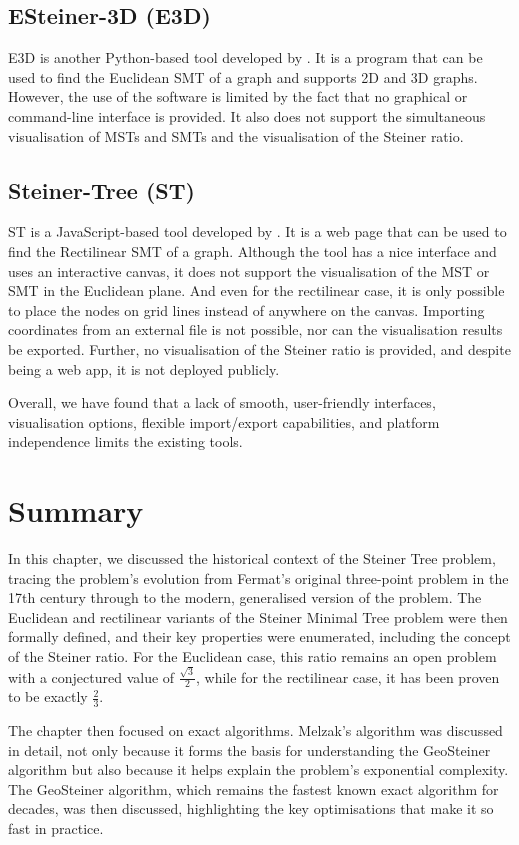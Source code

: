 \documentclass{l4proj}
\begin{document}
\subsection{ESteiner-3D (E3D)}
E3D is another Python-based tool developed by \cite{ESteiner-3D}. It is a program that can be used to find the Euclidean SMT of a graph and supports 2D and 3D graphs. However, the use of the software is limited by the fact that no graphical or command-line interface is provided. It also does not support the simultaneous visualisation of MSTs and SMTs and the visualisation of the Steiner ratio.

\subsection{Steiner-Tree (ST)}
ST is a JavaScript-based tool developed by \cite{Steiner-Tree}. It is a web page that can be used to find the Rectilinear SMT of a graph. Although the tool has a nice interface and uses an interactive canvas, it does not support the visualisation of the MST or SMT in the Euclidean plane. And even for the rectilinear case, it is only possible to place the nodes on grid lines instead of anywhere on the canvas. Importing coordinates from an external file is not possible, nor can the visualisation results be exported. Further, no visualisation of the Steiner ratio is provided, and despite being a web app, it is not deployed publicly.

Overall, we have found that a lack of smooth, user-friendly interfaces, visualisation options, flexible import/export capabilities, and platform independence limits the existing tools.

\section{Summary}
In this chapter, we discussed the historical context of the Steiner Tree problem, tracing the problem's evolution from Fermat's original three-point problem in the 17th century through to the modern, generalised version of the problem. The Euclidean and rectilinear variants of the Steiner Minimal Tree problem were then formally defined, and their key properties were enumerated, including the concept of the Steiner ratio. For the Euclidean case, this ratio remains an open problem with a conjectured value of $\frac{\sqrt{3}}{2}$, while for the rectilinear case, it has been proven to be exactly $\frac{2}{3}$.

The chapter then focused on exact algorithms. Melzak's algorithm was discussed in detail, not only because it forms the basis for understanding the GeoSteiner algorithm but also because it helps explain the problem's exponential complexity. The GeoSteiner algorithm, which remains the fastest known exact algorithm for decades, was then discussed, highlighting the key optimisations that make it so fast in practice.
\end{document}
